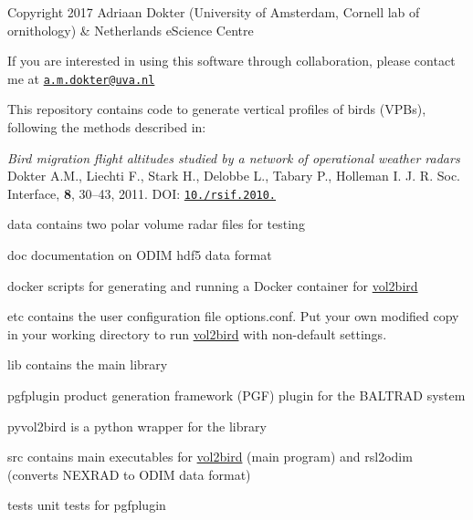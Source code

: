 Copyright 2017 Adriaan Dokter (University of Amsterdam, Cornell lab of ornithology) \& Netherlands e\+Science Centre

If you are interested in using this software through collaboration, please contact me at \href{mailto:a.m.dokter@uva.nl}{\tt a.\+m.\+dokter@uva.\+nl}

This repository contains code to generate vertical profiles of birds (V\+P\+Bs), following the methods described in\+:

{\itshape Bird migration flight altitudes studied by a network of operational weather radars} Dokter A.\+M., Liechti F., Stark H., Delobbe L., Tabary P., Holleman I. J. R. Soc. Interface, {\bfseries 8}, 30–43, 2011. D\+OI\+: \href{https://doi.org/10.1098/rsif.2010.0116}{\tt 10./rsif.2010.}


\begin{DoxyItemize}
\item {\ttfamily data} contains two polar volume radar files for testing
\item {\ttfamily doc} documentation on O\+D\+IM hdf5 data format
\item {\ttfamily docker} scripts for generating and running a Docker container for \mbox{\hyperlink{structvol2bird}{vol2bird}}
\item {\ttfamily etc} contains the user configuration file {\ttfamily options.\+conf}. Put your own modified copy in your working directory to run \mbox{\hyperlink{structvol2bird}{vol2bird}} with non-\/default settings.
\item {\ttfamily lib} contains the main library
\item {\ttfamily pgfplugin} product generation framework (P\+GF) plugin for the B\+A\+L\+T\+R\+AD system
\item {\ttfamily pyvol2bird} is a python wrapper for the library
\item {\ttfamily src} contains main executables for \mbox{\hyperlink{structvol2bird}{vol2bird}} (main program) and rsl2odim (converts N\+E\+X\+R\+AD to O\+D\+IM data format)
\item {\ttfamily tests} unit tests for pgfplugin 
\end{DoxyItemize}